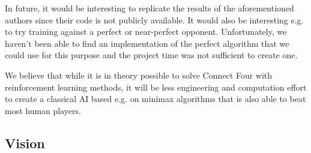 \documentclass[10pt,twocolumn,letterpaper]{article}
\begin{document}
In future, it would be interesting to replicate the results of the aforementioned
authors since their code is not publicly available.
It would also be interesting e.g. to try training against a perfect or near-perfect opponent.
Unfortunately, we haven't been able to find an implementation of the perfect algorithm that we could use for this purpose and the project time was not sufficient to create one.

We believe that while it is in theory possible to solve Connect Four with
reinforcement learning methods, it will be less engineering and computation
effort to create a classical AI based e.g. on minimax algorithms that is also
able to beat most human players.

\subsection{Vision}


{\small
\printbibliography
}
\end{document}
